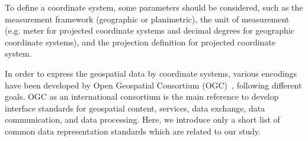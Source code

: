 \documentclass[a4paper,12pt]{article}
\begin{document}
To define a coordinate system, some parameters should be considered, such as the measurement framework (geographic  or planimetric), the unit of measurement (e.g. meter for projected coordinate systems and decimal degrees for geographic coordinate systems), and the projection definition for projected coordinate system.

In order to express the geospatial data by coordinate systems, various encodings have been developed by Open Geospatial Consortium (OGC)~\cite{ogc}, following different goals. OGC as an international consortium is the main reference to develop interface standards for geospatial content, services, data exchange, data communication, and data processing. Here, we introduce only a short list of common data representation standards which are related to our study.
\end{document}

